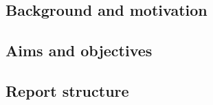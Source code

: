     
    
    
    \subsection{Background and motivation}
    
    \subsection{Aims and objectives}
    
    
    \subsection{Report structure} %
    
